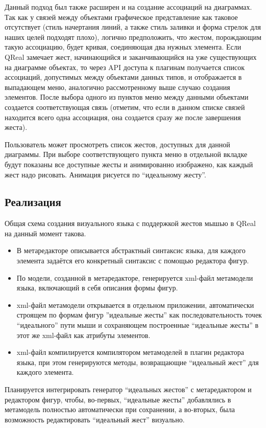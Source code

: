 \documentclass[a5paper]{article}
\begin{document}
Данный подход был также расширен и на создание ассоциаций на диаграммах. Так как у связей между объектами графическое представление как таковое отсутствует (стиль начертания линий, а также стиль заливки и форма стрелок для наших целей подходят плохо), логично 
предположить, что жестом, порождающим такую ассоциацию, будет кривая, соединяющая два нужных элемента. Если QReal замечает жест, начинающийся и заканчивающийся на уже существующих на диаграмме объектах, то через API доступа к плагинам получается список 
ассоциаций, допустимых между объектами данных типов, и отображается в выпадающем меню, аналогично рассмотренному выше случаю создания элементов. После выбора одного из пунктов меню между данными объектами создается соответствующая связь (отметим, что если в данном списке связей находится всего одна ассоциация, она создается сразу же после завершения жеста).

Пользователь может просмотреть список жестов, доступных для данной диаграммы. При выборе соответствующего пункта меню в отдельной вкладке будут показаны все доступные жесты и анимированно изображено, как каждый жест надо рисовать. Анимация рисуется по ``идеальному жесту''.

\subsection{Реализация}

Общая схема создания визуального языка с поддержкой жестов мышью в QReal на данный момент такова.
\begin{itemize}
  \item В метаредакторе описывается абстрактный синтаксис языка, для каждого элемента задаётся его конкретный синтаксис с помощью редактора фигур.
  \item По модели, созданной в метаредакторе, генерируется xml-файл метамодели языка, включающий в себя описания формы фигур.
  \item xml-файл метамодели открывается в отдельном приложении, автоматически строящем по формам фигур ''идеальные жесты'' как последовательность точек ``идеального'' пути мыши и сохраняющем построенные ``идеальные жесты'' в этот же xml-файл как атрибуты элементов.
  \item xml-файл компилируется компилятором метамоделей в плагин редактора языка, при этом генерируются методы, возвращающие ``идеальный жест'' для каждого элемента.
\end{itemize}
Планируется интегрировать генератор ``идеальных жестов'' с метаредактором и редактором фигур, чтобы, во-первых, ``идеальные жесты'' добавлялись в метамодель полностью автоматически при сохранении, а во-вторых, была возможность редактировать ``идеальный жест'' визуально.
\end{document}
